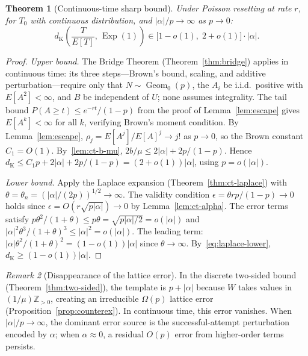 \documentclass[11pt]{article}
\theoremstyle{plain}
\newtheorem{theorem}{Theorem}[section]
\theoremstyle{definition}
\theoremstyle{remark}
\newtheorem{remark}[theorem]{Remark}
\DeclareMathOperator{\Exp}{Exp}
\DeclareMathOperator{\Geom}{Geom}
\newcommand{\dK}{d_{\mathrm{K}}}
\begin{document}
\begin{theorem}[Continuous-time sharp bound]\label{thm:ct-sharp}
Under Poisson resetting at rate $r$, for $T_0$ with continuous distribution, %
and $|\alpha|/p \to \infty$ as $p \to 0$:
\begin{equation}\label{eq:ct-sharp}
  \dK\!\left(\frac{T}{E[T]},\, \Exp(1)\right) \in \bigl[1-o(1),\; 2+o(1)\bigr] \cdot |\alpha|.
\end{equation}
\end{theorem}

\begin{proof}

\emph{Upper bound.}\;
The Bridge Theorem (Theorem~\ref{thm:bridge}) applies in continuous time: its three steps---Brown's bound, scaling, and additive perturbation---require only that $N \sim \Geom_0(p)$, the $A_i$ be i.i.d.\ positive with $E[A^2] < \infty$, and $B$ be independent of $U$; none assumes integrality.  The tail bound $P(A \geq t) \leq e^{-rt}/(1-p)$ from the proof of Lemma~\ref{lem:escape} gives $E[A^k] < \infty$ for all $k$, verifying Brown's moment condition.  By Lemma~\ref{lem:escape}, $\rho_j = E[A^j]/E[A]^j \to j!$ as $p \to 0$, so the Brown constant $C_1 = O(1)$.  By~\eqref{lem:ct-b-mu}, $2b/\mu \leq 2|\alpha| + 2p/(1-p)$.  Hence $\dK \leq C_1 p + 2|\alpha| + 2p/(1-p) = (2+o(1))|\alpha|$, using $p = o(|\alpha|)$.




\emph{Lower bound.}\;
Apply the Laplace expansion (Theorem~\ref{thm:ct-laplace}) with $\theta = \theta_n = (|\alpha|/(2p))^{1/2} \to \infty$.  The validity condition $\epsilon = \theta rp/(1-p) \to 0$ holds since $\epsilon = O(r\sqrt{p|\alpha|}) \to 0$ by Lemma~\ref{lem:ct-alpha}.  The error terms satisfy $p\theta^2/(1+\theta) \leq p\theta = \sqrt{p|\alpha|/2} = o(|\alpha|)$ and $|\alpha|^2\theta^3/(1+\theta)^3 \leq |\alpha|^2 = o(|\alpha|)$.  The leading term: $|\alpha|\theta^2/(1+\theta)^2 = (1-o(1))|\alpha|$ since $\theta \to \infty$.  By~\eqref{eq:laplace-lower}, $\dK \geq (1-o(1))|\alpha|$.
\end{proof}

\begin{remark}[Disappearance of the lattice error]\label{rem:no-lattice}
In the discrete two-sided bound (Theorem~\ref{thm:two-sided}), the template is $p + |\alpha|$ because $W$ takes values in $(1/\mu)\mathbb{Z}_{>0}$, creating an irreducible $\Omega(p)$ lattice error (Proposition~\ref{prop:counterex}).  In continuous time, this error vanishes.  When $|\alpha|/p \to \infty$, the dominant error source is the successful-attempt perturbation encoded by $\alpha$; when $\alpha \approx 0$, a residual $O(p)$ error from higher-order terms persists.
\end{remark}
\end{document}

